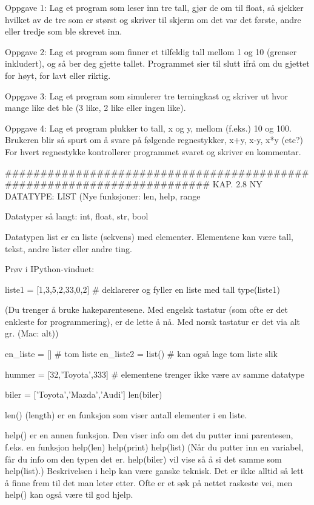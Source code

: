 \documentclass[a4paper,11pt,utf8]{book}
\begin{document}
Oppgave 1: Lag et program som leser inn tre tall, gjør de om til float, 
så sjekker hvilket av de tre som er størst og skriver til skjerm om
det var det første, andre eller tredje som ble skrevet inn. 


Oppgave 2: Lag et program som finner et tilfeldig tall mellom 1 og 10
(grenser inkludert), og så ber deg gjette tallet.
Programmet sier til slutt ifrå om du gjettet for høyt, for lavt eller riktig. 


Oppgave 3: Lag et program som simulerer tre terningkast og skriver ut hvor mange
like det ble (3 like, 2 like eller ingen like). 


Oppgave 4: Lag et program plukker to tall, x og y, mellom (f.eks.) 10 og 100. 
Brukeren blir så spurt om å svare på følgende regnestykker, x+y, x-y, x*y (etc?) 
For hvert regnestykke kontrollerer programmet svaret og skriver en kommentar. 




######################################################################## 
KAP. 2.8  NY DATATYPE: LIST
(Nye funksjoner: len, help, range

Datatyper så langt: int, float, str, bool


Datatypen list er en liste (sekvens) med elementer. 
Elementene kan være tall, tekst, andre lister eller andre ting.

Prøv i IPython-vinduet:

liste1 = [1,3,5,2,33,0,2]  # deklarerer og fyller en liste med tall
type(liste1)

(Du trenger å bruke hakeparentesene. 
Med engelsk tastatur (som ofte er det enkleste for programmering), 
er de lette å nå. Med norsk tastatur er det via alt gr. (Mac: alt)) 

en_liste = []        # tom liste
en_liste2 = list()   # kan også lage tom liste slik

hummer = [32,'Toyota',333]   # elementene trenger ikke være av samme datatype

biler = ['Toyota','Mazda','Audi'] 
len(biler) 

len() (length) er en funksjon som viser antall elementer i en liste. 


help() er en annen funksjon. Den viser info om det du putter inni parentesen, 
f.eks. en funksjon
help(len)
help(print)
help(list)
(Når du putter inn en variabel, får du info om den typen det er. 
help(biler) vil vise så å si det samme som help(list).)  
Beskrivelsen i help kan være ganske teknisk. 
Det er ikke alltid så lett å finne frem til det man leter etter.
Ofte er et søk på nettet raskeste vei, men help() kan også være til god hjelp. 
\end{document}
